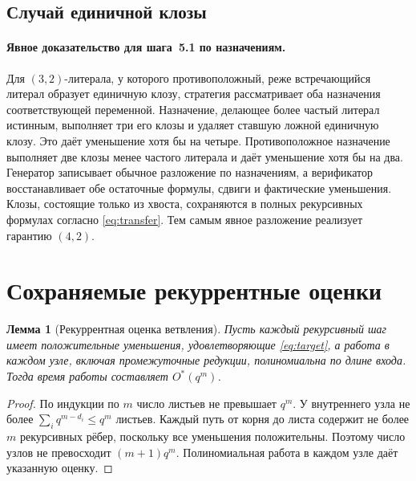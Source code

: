 \documentclass[10pt,twoside]{article}
\newcommand{\OhStar}{O^*}
\newtheorem{lemma}[theorem]{Лемма}
\theoremstyle{definition}
\theoremstyle{remark}
\begin{document}
\subsection{Случай единичной клозы}
\label{sec:strategies}

\paragraph{Явное доказательство для шага~5.1 по назначениям.}
Для $(3,2)$-литерала, у которого противоположный, реже встречающийся
литерал образует единичную клозу, стратегия рассматривает оба назначения
соответствующей переменной. Назначение, делающее более частый литерал
истинным, выполняет три его клозы и удаляет ставшую ложной единичную
клозу. Это даёт уменьшение хотя бы на четыре. Противоположное назначение
выполняет две клозы менее частого литерала и даёт уменьшение хотя бы
на два. Генератор записывает обычное разложение по назначениям, а
верификатор восстанавливает обе остаточные формулы, сдвиги и фактические
уменьшения. Клозы, состоящие только из хвоста, сохраняются в полных
рекурсивных формулах согласно \eqref{eq:transfer}. Тем самым явное
разложение реализует гарантию $(4,2)$.

\section{Сохраняемые рекуррентные оценки}
\label{app:recurrences}

\begin{lemma}[Рекуррентная оценка ветвления]
\label{lem:recurrence}
Пусть каждый рекурсивный шаг имеет положительные уменьшения,
удовлетворяющие \eqref{eq:target}, а работа в каждом узле, включая
промежуточные редукции, полиномиальна по длине входа. Тогда время
работы составляет $\OhStar(q^m)$.
\end{lemma}
\begin{proof}
По индукции по $m$ число листьев не превышает $q^m$. У внутреннего
узла не более $\sum_i q^{m-d_i}\le q^m$ листьев. Каждый путь
от корня до листа содержит не более $m$ рекурсивных рёбер, поскольку
все уменьшения положительны. Поэтому число узлов не превосходит
$(m+1)q^m$. Полиномиальная работа в каждом узле даёт указанную оценку.
\end{proof}
\end{document}
